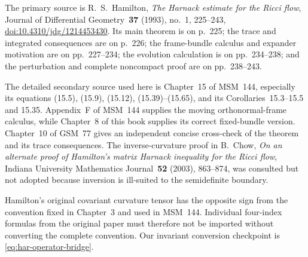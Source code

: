 \documentclass[10pt]{coll-l}
\theoremstyle{definition}
\theoremstyle{remark}
\numberwithin{section}{chapter}
\numberwithin{equation}{chapter}
\begin{document}
The primary source is R.~S.~Hamilton,
\emph{The Harnack estimate for the Ricci flow}, Journal of Differential
Geometry~\textbf{37} (1993), no.~1, 225--243,
\href{https://doi.org/10.4310/jdg/1214453430}
{doi:10.4310/jdg/1214453430}.  Its main theorem is on p.~225; the trace and
integrated consequences are on p.~226; the frame-bundle calculus and
expander motivation are on pp.~227--234; the evolution calculation is on
pp.~234--238; and the perturbation and complete noncompact proof are on
pp.~238--243.

The detailed secondary source used here is Chapter~15 of MSM~144, especially
its equations (15.5), (15.9), (15.12), (15.39)--(15.65), and its
Corollaries~15.3--15.5 and 15.35.  Appendix~F of MSM~144 supplies the moving
orthonormal-frame calculus, while Chapter~8 of this book supplies its
correct fixed-bundle version.  Chapter~10 of GSM~77 gives an independent
concise cross-check of the theorem and its trace consequences.  The
inverse-curvature proof in B.~Chow,
\emph{On an alternate proof of Hamilton's matrix Harnack inequality for the
Ricci flow}, Indiana University Mathematics Journal~\textbf{52} (2003),
863--874, was consulted but not adopted because inversion is ill-suited to
the semidefinite boundary.

Hamilton's original covariant curvature tensor has the opposite sign from
the convention fixed in Chapter~3 and used in MSM~144.  Individual
four-index formulas from the original paper must therefore not be imported
without converting the complete convention.  Our invariant conversion
checkpoint is \eqref{eq:har-operator-bridge}.
\end{document}
